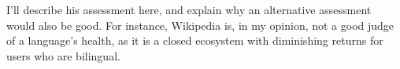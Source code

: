 
I'll describe his assessment here, and explain why an alternative assessment would also be good. For instance, Wikipedia is, in my opinion, not a good judge of a language's health, as it is a closed ecosystem with diminishing returns for users who are bilingual.



%


